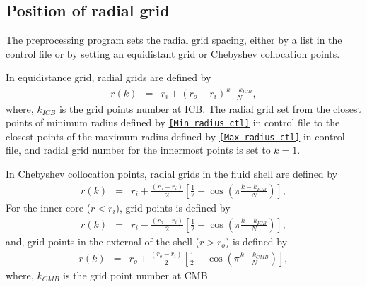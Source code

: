 \subsection{Position of radial grid}
The preprocessing program sets the radial grid spacing, either by a list in the control file or by setting an equidistant grid or Chebyshev collocation points.

In equidistance grid, radial grids are defined by
%
\begin{eqnarray}
r(k) & = & r_{i} + \left(r_{o}-r_{i} \right) \frac{k-k_{ICB}}{N},
\nonumber
\end{eqnarray}
%
where, $k_{ICB}$ is the grid points number at ICB. The radial grid set from the closest points of minimum radius defined by \hyperref[href_i:Min_radius_ctl]{\tt [Min\_radius\_ctl]} in control file to the closest points of the maximum radius defined by \hyperref[href_i:Max_radius_ctl]{\tt [Max\_radius\_ctl]} in control file, and radial grid number for the innermost points is set to $k = 1$.

In Chebyshev collocation points, radial grids in the fluid shell are defined by
%
\begin{eqnarray}
r(k) & = & r_{i} + \frac{\left(r_{o}-r_{i} \right)}{2} \left[ \frac{1}{2} - \cos \left(\pi \frac{ k-k_{ICB}}{N} \right) \right],
\nonumber
\end{eqnarray}
%
For the inner core ($r<r_{i}$), grid points is defined by
%
\begin{eqnarray}
r(k) & = & r_{i} - \frac{\left(r_{o}-r_{i} \right)}{2} \left[ \frac{1}{2} - \cos \left(\pi \frac{ k-k_{ICB}}{N} \right) \right],
\nonumber
\end{eqnarray}
%
and, grid points in the external of the shell ($r>r_{o}$) is defined by
%
\begin{eqnarray}
r(k) & = & r_{o} + \frac{\left(r_{o}-r_{i} \right)}{2} \left[ \frac{1}{2} - \cos \left(\pi \frac{ k-k_{CMB}}{N} \right) \right],
\nonumber
\end{eqnarray}
%
where, $k_{CMB}$ is the grid point number at CMB.

